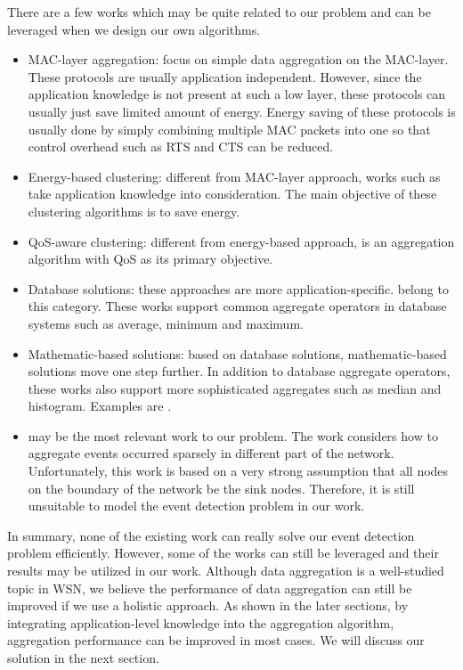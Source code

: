 There are a few works which may be quite related to our problem and can be leveraged when we design our own algorithms.
\begin{itemize}
	\item MAC-layer aggregation: \cite{aida, daa} focus on simple data aggregation on the MAC-layer. These protocols are usually application independent. However, since the application knowledge is not present at such a low layer, these protocols can usually just save limited amount of energy. Energy saving of these protocols is usually done by simply combining multiple MAC packets into one so that control overhead such as RTS and CTS can be reduced.
	\item Energy-based clustering: different from MAC-layer approach, works such as \cite{lpt, xue:lp, iheed, epas, mfst} take application knowledge into consideration. The main objective of these clustering algorithms is to save energy.
	\item QoS-aware clustering: different from energy-based approach, \cite{qdap} is an aggregation algorithm with QoS as its primary objective.
	\item Database solutions: these approaches are more application-specific. \cite{tag, tina} belong to this category. These works support common aggregate operators in database systems such as average, minimum and maximum.
	\item Mathematic-based solutions: based on database solutions, mathematic-based solutions move one step further. In addition to database aggregate operators, these works also support more sophisticated aggregates such as median and histogram. Examples are \cite{qdigest, akca:deterministic, jiang:statistical}.
	\item \cite{doubleruling} may be the most relevant work to our problem. The work considers how to aggregate events occurred sparsely in different part of the network. Unfortunately, this work is based on a very strong assumption that all nodes on the boundary of the network be the sink nodes. Therefore, it is still unsuitable to model the event detection problem in our work.
\end{itemize}

In summary, none of the existing work can really solve our event detection problem efficiently. However, some of the works can still be leveraged and their results may be utilized in our work. Although data aggregation is a well-studied topic in WSN, we believe the performance of data aggregation can still be improved if we use a holistic approach. As shown in the later sections, by integrating application-level knowledge into the aggregation algorithm, aggregation performance can be improved in most cases. We will discuss our solution in the next section.
